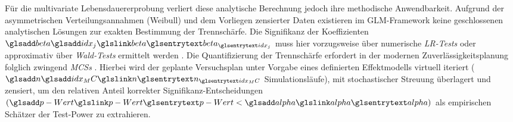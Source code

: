 Für die multivariate Lebensdauererprobung verliert diese analytische Berechnung jedoch ihre methodische Anwendbarkeit.
Aufgrund der asymmetrischen Verteilungsannahmen (Weibull) und dem Vorliegen zensierter Daten existieren im \ac{GLM}-Framework keine geschlossenen analytischen Lösungen zur exakten Bestimmung der Trennschärfe.
Die Signifikanz der Koeffizienten $\symsub{beta}{idx_j}$ muss hier vorzugsweise über numerische \textit{\acp{LR-Test}} oder approximativ über \textit{Wald-Tests} ermittelt werden \cite{Rigdon.2022, Meeker.2022, McCulloch.2001}.
Die Quantifizierung der Trennschärfe erfordert in der modernen Zuverlässigkeitsplanung folglich zwingend \textit{\acp{MCS}} \cite{Kremer.2021, Arndt.2022, Khuri.2006}.
Hierbei wird der geplante Versuchsplan unter Vorgabe eines definierten Effektmodells virtuell iteriert ($\symsub{n}{idx_MC}$ Simulationsläufe), mit stochastischer Streuung überlagert und zensiert, um den relativen Anteil korrekter Signifikanz-Entscheidungen $(\sym{p-Wert} < \sym{alpha})$ als empirischen Schätzer der Test-Power zu extrahieren.



